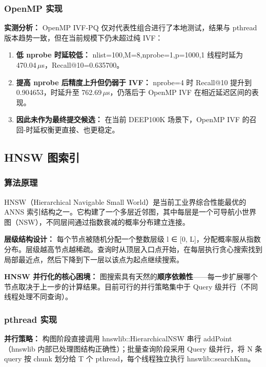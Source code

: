 \documentclass[a4paper]{article}
\begin{document}
\subsubsection{OpenMP 实现}

\textbf{实测分析：} OpenMP IVF-PQ 仅对代表性组合进行了本地测试，结果与 pthread 版本趋势一致，但在当前规模下仍未超过纯 IVF：

\begin{enumerate}
\item \textbf{低 nprobe 时延较低：} nlist=100,M=8,nprobe=1,p=1000,1 线程时延为 470.04\,$\mu$s，Recall@10=0.635700。
\item \textbf{提高 nprobe 后精度上升但仍弱于 IVF：} nprobe=4 时 Recall@10 提升到 0.904653，时延升至 762.69\,$\mu$s，仍落后于 OpenMP IVF 在相近延迟区间的表现。
\item \textbf{因此未作为最终提交候选：} 在当前 DEEP100K 场景下，OpenMP IVF 的召回-时延权衡更直接、也更稳定。
\end{enumerate}

\subsection{HNSW 图索引}

\subsubsection{算法原理}

HNSW（Hierarchical Navigable Small World）是当前工业界综合性能最优的 ANNS 索引结构之一。它构建了一个多层近邻图，其中每层是一个可导航小世界图（NSW），不同层间通过指数衰减的概率分布建立连接。

\textbf{层级结构设计：} 每个节点被随机分配一个整数层级 l ∈ [0, L]，分配概率服从指数分布。层级越高节点越稀疏。查询时从顶层入口点开始，在每层执行贪心搜索找到局部最近点，然后下降到下一层以该点为起点继续搜索。

\textbf{HNSW 并行化的核心困境：} 图搜索具有天然的\textbf{顺序依赖性}——每一步扩展哪个节点取决于上一步的计算结果。目前可行的并行策略集中于 Query 级并行（不同线程处理不同查询）。

\subsubsection{pthread 实现}

\textbf{并行策略：} 构图阶段直接调用 hnswlib::HierarchicalNSW 串行 addPoint（hnswlib 内部已处理图结构正确性）；批量查询阶段采用 Query 级并行，将 N 条 query 按 chunk 划分给 T 个 pthread，每个线程独立执行 hnswlib::searchKnn。
\end{document}
